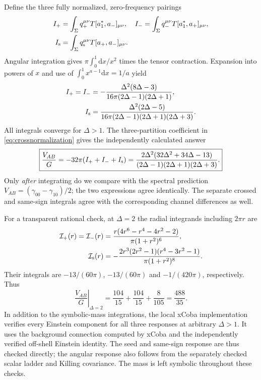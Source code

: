 \documentclass[11pt,a4paper]{article}
\numberwithin{equation}{section}
\theoremstyle{remark}\newtheorem{remark}[theorem]{Remark}
\newcommand{\dd}{\mathrm d}
\begin{document}
Define the three fully normalized, zero-frequency pairings
\begin{align}
 I_+&=\int_\Sigma q_+^{\mu\nu}T[a_1^*,a_-]_{\mu\nu},&
 I_-&=\int_\Sigma q_-^{\mu\nu}T[a_1^*,a_+]_{\mu\nu},\nonumber\\
 I_{\rm s}&=\int_\Sigma q_{\rm s}^{\mu\nu}T[a_+,a_-]_{\mu\nu}.
\end{align}
Angular integration gives $\pi\int_0^1\dd x/x^2$ times the tensor contraction. Expansion into powers of $x$ and use of $\int_0^1x^{a-1}\dd x=1/a$ yield
\begin{align}
 I_+=I_-&=-\frac{\Delta^2(8\Delta-3)}{16\pi(2\Delta-1)(2\Delta+1)},\nonumber\\
 I_{\rm s}&=\frac{\Delta^2(2\Delta-5)}{16\pi(2\Delta-1)(2\Delta+1)(2\Delta+3)}.
 \label{eq:ABintegrals}
\end{align}
All integrals converge for $\Delta>1$. The three-partition coefficient in \eqref{eq:crossnormalization} gives the independently calculated answer
\begin{equation}
 \boxed{\frac{V_{AB}}G=-32\pi(I_++I_-+I_{\rm s})
 =\frac{2\Delta^2(32\Delta^2+34\Delta-13)}
 {(2\Delta-1)(2\Delta+1)(2\Delta+3)}.}
 \label{eq:VAB}
\end{equation}
Only \emph{after} integrating do we compare with the spectral prediction
$V_{AB}=(\gamma_{00}-\gamma_{10})/2$; the two expressions agree identically. The separate crossed and same-sign integrals agree with the corresponding channel differences as well.

For a transparent rational check, at $\Delta=2$ the radial integrands including $2\pi r$ are
\begin{align}
 \mathcal I_+(r)=\mathcal I_-(r)
 &=\frac{r(4r^6-r^4-4r^2-2)}{\pi(1+r^2)^6},\nonumber\\
 \mathcal I_{\rm s}(r)
 &=-\frac{2r^3(2r^2-1)(r^4-3r^2-1)}{\pi(1+r^2)^8}.
\end{align}
Their integrals are $-13/(60\pi)$, $-13/(60\pi)$ and $-1/(420\pi)$, respectively. Thus
\begin{equation}
 \left.\frac{V_{AB}}G\right|_{\Delta=2}
 =\frac{104}{15}+\frac{104}{15}+\frac8{105}=\frac{488}{35}.
\end{equation}
In addition to the symbolic-mass integrations, the local xCoba implementation verifies every Einstein component for all three responses at arbitrary $\Delta>1$. It uses the background connection computed by xCoba and the independently verified off-shell Einstein identity. The seed and same-sign response are thus checked directly; the angular response also follows from the separately checked scalar ladder and Killing covariance. The mass is left symbolic throughout these checks.
\end{document}
